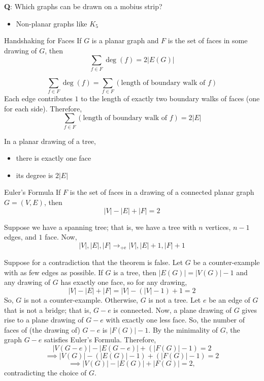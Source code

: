 
\textbf{Q}: Which graphs can be drawn on a mobius strip?

\begin{itemize}
    \item Non-planar graphs like $ K_5 $
\end{itemize}


\begin{Theorem}{Handshaking for Faces}{}
    If $ G $ is a planar graph and $ F $ is the set of
    faces in some drawing of $ G $, then
    \[ \sum\limits_{f\in F}\deg(f)=2|E(G)| \]
\end{Theorem}


\begin{Proof}{}{}
    \[ \sum\limits_{f\in F}\deg(f)
        =\sum\limits_{f\in F}(\text{length of boundary walk of }f) \]
    Each edge contributes $ 1 $ to the length of exactly
    two boundary walks of faces (one for each side).
    Therefore,
    \[ \sum\limits_{f\in F}(\text{length of boundary walk of }f)
        =2|E| \]
\end{Proof}

In a planar drawing of a tree,
\begin{itemize}
    \item there is exactly one face
    \item its degree is $ 2|E| $
\end{itemize}


\begin{Theorem}{Euler's Formula}{}
    If $ F $ is the set of faces in a drawing of a connected
    planar graph $ G=(V,E) $, then
    \[ |V|-|E|+|F|=2 \]
\end{Theorem}

Suppose we have a spanning tree; that is, we have a tree with
$ n $ vertices, $ n-1 $ edges, and $ 1 $ face. Now,
\[ |V|,|E|,|F|\longrightarrow_{\text{+e}} |V|, |E|+1,|F|+1 \]
\begin{Proof}{}{}
    Suppose for a contradiction that the theorem is false.
    Let $ G $ be a counter-example with as few edges as possible.
    If $ G $ is a tree, then $ |E(G)|=|V(G)|-1 $ and any
    drawing of $ G $ has exactly one face, so for any
    drawing,
    \[ |V|-|E|+|F|=|V|-(|V|-1)+1=2 \]
    So, $ G $ is not a counter-example. Otherwise, $ G $
    is not a tree. Let $ e $ be an edge of $ G $ that is not
    a bridge; that is, $ G-e $ is connected. Now, a plane
    drawing of $ G $ gives rise to a plane drawing of $ G-e $
    with exactly one less face. So, the number of faces of
    (the drawing of) $ G-e $ is $ |F(G)|-1 $. By the minimality
    of $ G $, the graph $ G-e $ satisfies Euler's Formula.
    Therefore,
    \[ |V(G-e)|-|E(G-e)|+(|F(G)|-1)=2 \]
    \[ \implies |V(G)|-(|E(G)|-1)+(|F(G)|-1)=2 \]
    \[ \implies |V(G)|-|E(G)|+|F(G)|=2, \]
    contradicting the choice of $ G $.
\end{Proof}


